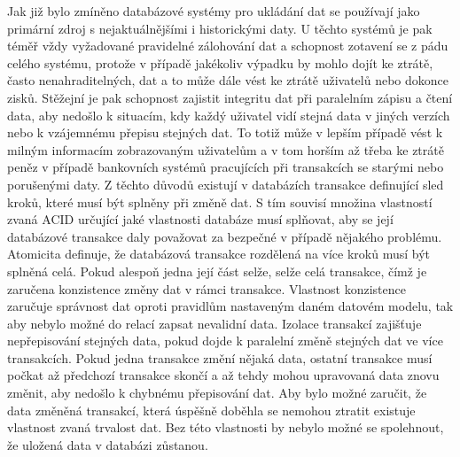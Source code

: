 		Jak již bylo zmíněno databázové systémy pro ukládání dat se používají jako primární zdroj s nejaktuálnějšími i
		historickými daty.
		U těchto systémů je pak téměř vždy vyžadované pravidelné zálohování dat a schopnost zotavení se z pádu celého
		systému, protože v případě jakékoliv výpadku by mohlo dojít ke ztrátě, často nenahraditelných, dat a to může
		dále vést ke ztrátě uživatelů nebo dokonce zisků.
		Stěžejní je pak schopnost zajistit integritu dat při paralelním zápisu a čtení data, aby nedošlo k situacím,
		kdy každý uživatel vidí stejná data v jiných verzích nebo k vzájemnému přepisu stejných dat.
		To totiž může v lepším případě vést k milným informacím zobrazovaným uživatelům a v tom horším až třeba ke ztrátě
		peněz v případě bankovních systémů pracujících při transakcích se starými nebo porušenými daty.
		Z těchto důvodů existují v databázích transakce definující sled kroků, které musí být splněny při změně dat.
		S tím souvisí množina vlastností zvaná \noindent\Ac{ACID} určující jaké vlastnosti databáze musí
		splňovat, aby se její databázové transakce daly považovat za bezpečné v případě nějakého problému.
		Atomicita definuje, že databázová transakce rozdělená na více kroků musí být splněná celá.
		Pokud alespoň jedna její část selže, selže celá transakce, čímž je zaručena konzistence změny dat v rámci transakce.
		Vlastnost konzistence zaručuje správnost dat oproti pravidlům nastaveným daném datovém modelu, tak aby nebylo možné
		do relací zapsat nevalidní data.
		Izolace transakcí zajišťuje nepřepisování stejných data, pokud dojde k paralelní změně stejných dat ve více
		transakcích.
		Pokud jedna transakce změní nějaká data, ostatní transakce musí počkat až předchozí transakce skončí a až tehdy
		mohou upravovaná data znovu změnit, aby nedošlo k chybnému přepisování dat.
		Aby bylo možné zaručit, že data změněná transakcí, která úspěšně doběhla se nemohou ztratit existuje vlastnost
		zvaná trvalost dat.
		Bez této vlastnosti by nebylo možné se spolehnout, že uložená data v databázi zůstanou. \cite{acid-compliance}

